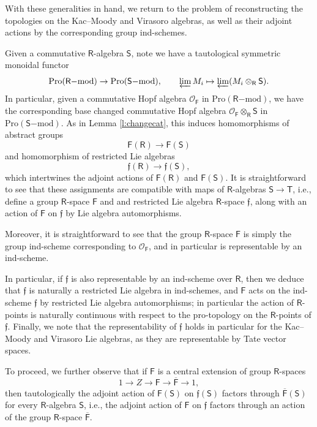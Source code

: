 \documentclass{amsart}
\theoremstyle{definition}
\newcommand{\OOF}{\OO_{\mathsf{F}}}
\newcommand{\lmod}{\on{-mod}}
\newcommand{\Pro}{\on{Pro}}
\newcommand{\sss}{\subsubsection{}}
\newcommand{\sF}{\mathsf{F}}
\newcommand{\Sing}{\mathsf{S}}
\newcommand{\Ting}{\mathsf{T}}
\newcommand{\OO}{\mathscr{O}}
\newcommand{\on}{\mathrm}
\newcommand{\Ring}{\mathsf{R}}
\newcommand{\ff}{\mathfrak{f}}
\numberwithin{equation}{section}
\begin{document}
\sss \label{sss:adjointactions} With these generalities in hand, we return to the problem of reconstructing the topologies on the Kac--Moody and Virasoro algebras, as well as their adjoint actions by the corresponding group ind-schemes. 

Given a commutative $\Ring$-algebra $\Sing$, note we have a tautological symmetric monoidal functor
$$\Pro(\Ring\lmod) \rightarrow \Pro(\Sing\lmod), \quad \quad \varprojlim M_i \mapsto \varprojlim (M_i \otimes_\Ring \Sing).$$
In particular, given a commutative Hopf algebra $\OOF$ in $\Pro(\Ring\lmod)$,  we have the corresponding base changed commutative Hopf algebra $\OOF \otimes_\Ring \Sing$ in $\Pro(\Sing\lmod)$. As in Lemma \ref{l:changecat}, this induces  homomorphisms of abstract groups 
$$\sF(\Ring) \rightarrow \sF(\Sing)$$
and homomorphism of restricted Lie algebras
$$\ff(\Ring) \rightarrow \ff(\Sing),$$
which intertwines the adjoint actions of $\sF(\Ring)$ and $\sF(\Sing)$. It is straightforward to see that these assignments are compatible with maps of $\Ring$-algebras $\Sing \rightarrow \Ting$, i.e., define a group $\Ring$-space $\sF$ and and restricted Lie algebra $\Ring$-space $\ff$, along with an action of $\sF$ on $\ff$ by Lie algebra automorphisms. 

Moreover, it is straightforward to see that the group $\Ring$-space $\sF$ is simply the group ind-scheme corresponding to $\OOF$, and in particular is representable by an ind-scheme.  

In particular, if $\ff$ is also representable by an ind-scheme over $\Ring$, then we deduce that $\ff$ is naturally a restricted Lie algebra in ind-schemes, and $\sF$ acts on the ind-scheme $\ff$ by restricted Lie algebra automorphisms; in particular the action of $\Ring$-points is naturally continuous with respect to the pro-topology on the $\Ring$-points of $\ff$. Finally, we note that the representability of $\ff$ holds in particular for the Kac--Moody and Virasoro Lie algebras, as they are representable by Tate vector spaces.


To proceed, we further observe that if $\sF$ is a central extension 
 of group $\Ring$-spaces$$1 \rightarrow Z \rightarrow \sF \rightarrow \overline{\sF} \rightarrow 1,$$
then tautologically the adjoint action of $\sF(\Sing)$ on $\ff(\Sing)$ factors through $\overline{\sF}(\Sing)$ for every $\Ring$-algebra $\Sing$, i.e., the adjoint action of $\sF$ on $\ff$ factors through 
an action of the group $\Ring$-space $\overline{\sF}$.
\end{document}
